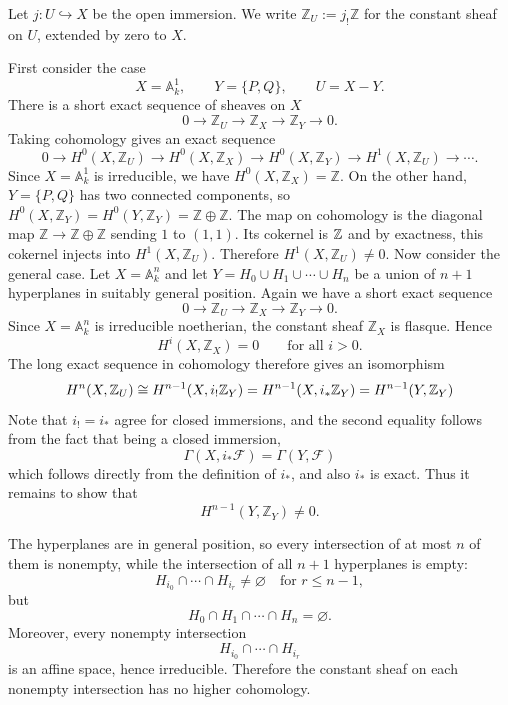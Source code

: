 \documentclass[12pt]{article}
\begin{document}
\begin{solution}
    Let $j:U\hookrightarrow X$ be the open immersion. We write $\mathbb Z_U:=j_!\mathbb Z$
    for the constant sheaf on $U$, extended by zero to $X$.

    First consider the case
    \[
        X=\mathbb A^1_k,
        \qquad
        Y=\{P,Q\},
        \qquad
        U=X-Y.
    \]
    There is a short exact sequence of sheaves on $X$
    \[
        0\to \mathbb Z_U\to \mathbb Z_X\to \mathbb Z_Y\to 0.
    \]
    Taking cohomology gives an exact sequence
    \[
        0\to H^0(X,\mathbb Z_U)
        \to H^0(X,\mathbb Z_X)
        \to H^0(X,\mathbb Z_Y)
        \to H^1(X,\mathbb Z_U)
        \to \cdots .
    \]
    Since $X=\mathbb A^1_k$ is irreducible, we have
    $
        H^0(X,\mathbb Z_X)=\mathbb Z.
    $
    On the other hand, $Y=\{P,Q\}$ has two connected components, so
    $
        H^0(X,\mathbb Z_Y)=H^0(Y,\mathbb Z_Y)
        =\mathbb Z\oplus \mathbb Z.
    $
    The map on cohomology is the diagonal map $\mathbb Z\to \mathbb Z\oplus \mathbb Z$ sending $1$ to $(1,1)$. Its cokernel is $\mathbb{Z}$
    and by exactness, this cokernel injects into $H^1(X,\mathbb Z_U)$. Therefore
    $
        H^1(X,\mathbb Z_U)\neq 0.
    $
    Now consider the general case. Let $X=\mathbb A^n_k$
    and let $Y=H_0\cup H_1\cup \cdots \cup H_n$
    be a union of $n+1$ hyperplanes in suitably general position.
    Again we have a short exact sequence
    \[
        0\to \mathbb Z_U\to \mathbb Z_X\to \mathbb Z_Y\to 0.
    \]
    Since $X=\mathbb A^n_k$ is irreducible noetherian, the constant sheaf
    $\mathbb Z_X$ is flasque. Hence
    \[
        H^i(X,\mathbb Z_X)=0
        \qquad
        \text{for all } i>0.
    \]
    The long exact sequence in cohomology therefore gives an isomorphism
    \[
        H^n(X,\mathbb Z_U)
        \cong
        H^{n-1}(X, i_! \mathbb{Z}_Y)
        =
        H^{n-1}(X, i_* \mathbb{Z}_Y)
        =
        H^{n-1}(Y,\mathbb Z_Y)
    \]
    Note that $i_! = i_*$ agree for closed immersions, and the second equality follows from the fact that being a closed immersion,
    \[\Gamma(X,i_*\mathcal F)=\Gamma(Y,\mathcal F)\]
    which follows directly from the definition of $i_*$, and also $i_*$ is exact.
    Thus it remains to show that
    \[
        H^{n-1}(Y,\mathbb Z_Y)\neq 0.
    \]

    The hyperplanes are in general position, so every intersection of at most
    $n$ of them is nonempty, while the intersection of all $n+1$ hyperplanes is
    empty:
    \[
        H_{i_0}\cap \cdots \cap H_{i_r}\neq \varnothing
        \quad \text{for } r\le n-1,
    \]
    but
    \[
        H_0\cap H_1\cap \cdots \cap H_n=\varnothing.
    \]
    Moreover, every nonempty intersection
    \[
        H_{i_0}\cap \cdots \cap H_{i_r}
    \]
    is an affine space, hence irreducible. Therefore the constant sheaf on each
    nonempty intersection has no higher cohomology.


\end{solution}
\end{document}
